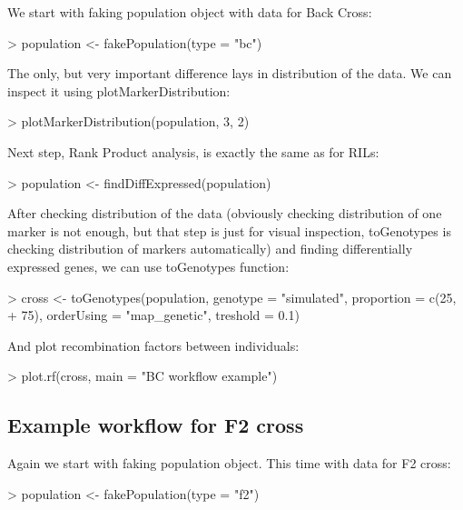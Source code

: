 \documentclass{article}
\begin{document}
{\noindent}We start with faking population object with data for Back Cross:
\begin{Schunk}
\begin{Sinput}
> population <- fakePopulation(type = "bc")
\end{Sinput}
\end{Schunk}

{\noindent}The only, but very important difference lays in distribution of the data. We can inspect it using plotMarkerDistribution:
\begin{Schunk}
\begin{Sinput}
> plotMarkerDistribution(population, 3, 2)
\end{Sinput}
\end{Schunk}

{\noindent}Next step, Rank Product analysis, is exactly the same as for RILs:
\begin{Schunk}
\begin{Sinput}
> population <- findDiffExpressed(population)
\end{Sinput}
\end{Schunk}

\newpage
{\noindent}After checking distribution of the data (obviously checking distribution of one marker is not enough, but that step is just for visual inspection, toGenotypes is
checking distribution of markers automatically) and finding differentially expressed genes, we can use toGenotypes function:
\begin{Schunk}
\begin{Sinput}
> cross <- toGenotypes(population, genotype = "simulated", proportion = c(25, 
+     75), orderUsing = "map_genetic", treshold = 0.1)
\end{Sinput}
\end{Schunk}

{\noindent}And plot recombination factors between individuals:
\begin{Schunk}
\begin{Sinput}
> plot.rf(cross, main = "BC workflow example")
\end{Sinput}
\end{Schunk}

\newpage
\subsection{Example workflow for F2 cross}
{\noindent}Again we start with faking population object. This time with data for F2 cross:
\begin{Schunk}
\begin{Sinput}
> population <- fakePopulation(type = "f2")
\end{Sinput}
\end{Schunk}
\end{document}
